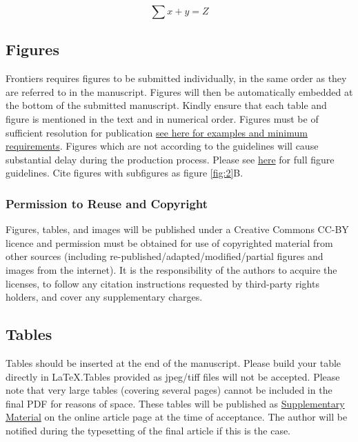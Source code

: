 \documentclass[utf8]{FrontiersinHarvard} %
\begin{document}
	\begin{equation}
		\sum x+ y =Z\label{eq:01}
	\end{equation}
	
	\subsection{Figures}
	Frontiers requires figures to be submitted individually, in the same order as they are referred to in the manuscript. Figures will then be automatically embedded at the bottom of the submitted manuscript. Kindly ensure that each table and figure is mentioned in the text and in numerical order. Figures must be of sufficient resolution for publication \href{https://www.frontiersin.org/about/author-guidelines#ImageSizeRequirements}{see here for examples and minimum requirements}. Figures which are not according to the guidelines will cause substantial delay during the production process. Please see \href{https://www.frontiersin.org/about/author-guidelines#FigureRequirementsStyleGuidelines}{here} for full figure guidelines. Cite figures with subfigures as figure \ref{fig:2}B.
	
	
	\subsubsection{Permission to Reuse and Copyright}
	Figures, tables, and images will be published under a Creative Commons CC-BY licence and permission must be obtained for use of copyrighted material from other sources (including re-published/adapted/modified/partial figures and images from the internet). It is the responsibility of the authors to acquire the licenses, to follow any citation instructions requested by third-party rights holders, and cover any supplementary charges.
	
	\subsection{Tables}
	Tables should be inserted at the end of the manuscript. Please build your table directly in LaTeX.Tables provided as jpeg/tiff files will not be accepted. Please note that very large tables (covering several pages) cannot be included in the final PDF for reasons of space. These tables will be published as \href{http://home.frontiersin.org/about/author-guidelines#SupplementaryMaterial}{Supplementary Material} on the online article page at the time of acceptance. The author will be notified during the typesetting of the final article if this is the case. 
	
\end{document}

